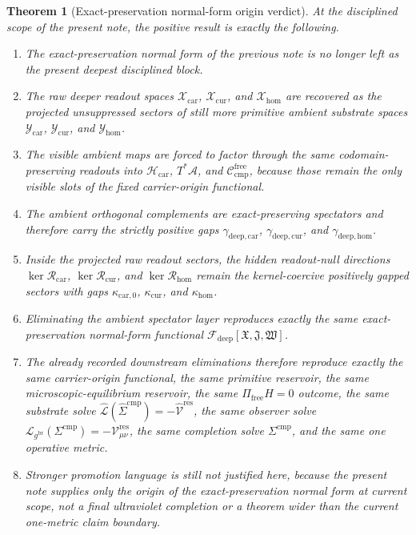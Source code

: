 \documentclass[11pt]{article}
\newcommand{\Sub}{\mathcal A}
\newcommand{\ObserverMetric}{g^{\mathrm{br}}}
\newcommand{\CompShift}{\Sigma^{\mathrm{cmp}}}
\newcommand{\CompLift}{\widehat\Sigma^{\mathrm{cmp}}}
\newcommand{\ResidualCore}{\mathcal V_{\mu\nu}^{\mathrm{res}}}
\newcommand{\ResidualLift}{\widehat{\mathcal V}^{\mathrm{res}}}
\newcommand{\SubReducedEin}{\widehat{\mathcal L}}
\newcommand{\ReducedEin}{\mathcal L_{\ObserverMetric}}
\newcommand{\CompFree}{\mathscr C_{\mathrm{cmp}}^{\mathrm{free}}}
\newcommand{\DeepFunctional}{\mathscr F_{\mathrm{deep}}}
\newcommand{\CarrierClass}{\mathscr H_{\mathrm{car}}}
\newcommand{\PreCarGap}{\kappa_{\mathrm{car},0}}
\newcommand{\CurrentGap}{\kappa_{\mathrm{cur}}}
\newcommand{\HomGap}{\kappa_{\mathrm{hom}}}
\newcommand{\DeepTensorClass}{\mathscr X_{\mathrm{car}}}
\newcommand{\DeepRelabelClass}{\mathscr X_{\mathrm{cur}}}
\newcommand{\DeepFreeClass}{\mathscr X_{\mathrm{hom}}}
\newcommand{\DeepTensor}{\mathfrak X}
\newcommand{\DeepRelabel}{\mathfrak J}
\newcommand{\DeepFree}{\mathfrak W}
\newcommand{\CarRead}{\mathcal R_{\mathrm{car}}}
\newcommand{\CurRead}{\mathcal R_{\mathrm{cur}}}
\newcommand{\HomRead}{\mathcal R_{\mathrm{hom}}}
\newcommand{\ProtoTensorClass}{\mathscr Y_{\mathrm{car}}}
\newcommand{\ProtoRelabelClass}{\mathscr Y_{\mathrm{cur}}}
\newcommand{\ProtoFreeClass}{\mathscr Y_{\mathrm{hom}}}
\newcommand{\ProtoCarGap}{\gamma_{\mathrm{deep,car}}}
\newcommand{\ProtoCurGap}{\gamma_{\mathrm{deep,cur}}}
\newcommand{\ProtoHomGap}{\gamma_{\mathrm{deep,hom}}}
\newtheorem{theorem}{Theorem}
\begin{document}
\begin{theorem}[Exact-preservation normal-form origin verdict]
\label{thm:verdict}
At the disciplined scope of the present note, the positive result is exactly the following.
\begin{enumerate}
    \item The exact-preservation normal form of the previous note is no longer left as the present deepest disciplined block.
    \item The raw deeper readout spaces \(\DeepTensorClass\), \(\DeepRelabelClass\), and \(\DeepFreeClass\) are recovered as the projected unsuppressed sectors of still more primitive ambient substrate spaces \(\ProtoTensorClass\), \(\ProtoRelabelClass\), and \(\ProtoFreeClass\).
    \item The visible ambient maps are forced to factor through the same codomain-preserving readouts into \(\CarrierClass\), \(T^*\Sub\), and \(\CompFree\), because those remain the only visible slots of the fixed carrier-origin functional.
    \item The ambient orthogonal complements are exact-preserving spectators and therefore carry the strictly positive gaps \(\ProtoCarGap\), \(\ProtoCurGap\), and \(\ProtoHomGap\).
    \item Inside the projected raw readout sectors, the hidden readout-null directions \(\ker\CarRead\), \(\ker\CurRead\), and \(\ker\HomRead\) remain the kernel-coercive positively gapped sectors with gaps \(\PreCarGap\), \(\CurrentGap\), and \(\HomGap\).
    \item Eliminating the ambient spectator layer reproduces exactly the same exact-preservation normal-form functional \(\DeepFunctional[\DeepTensor,\DeepRelabel,\DeepFree]\).
    \item The already recorded downstream eliminations therefore reproduce exactly the same carrier-origin functional, the same primitive reservoir, the same microscopic-equilibrium reservoir, the same \(\Pi_{\mathrm{free}}H=0\) outcome, the same substrate solve \(\SubReducedEin(\CompLift)=-\ResidualLift\), the same observer solve \(\ReducedEin(\CompShift)=-\ResidualCore\), the same completion solve \(\Sigma^{\mathrm{cmp}}\), and the same one operative metric.
    \item Stronger promotion language is still not justified here, because the present note supplies only the origin of the exact-preservation normal form at current scope, not a final ultraviolet completion or a theorem wider than the current one-metric claim boundary.
\end{enumerate}
\end{theorem}
\end{document}
